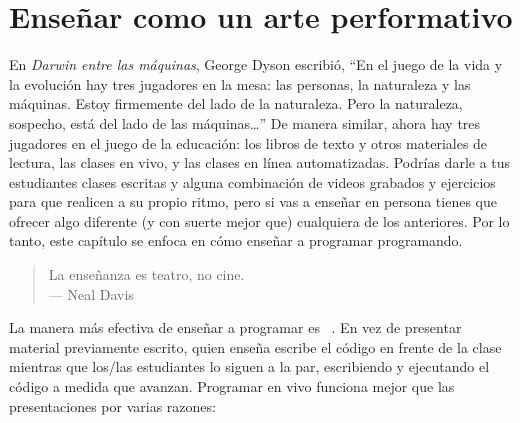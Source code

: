 \chapter{Enseñar como un arte performativo}\label{s:performance}

En \emph{Darwin entre las máquinas},
George Dyson escribió,
``En el juego de la vida y la evolución hay tres jugadores en la mesa:
las personas, la naturaleza y las máquinas.
Estoy firmemente del lado de la naturaleza.
Pero la naturaleza, sospecho, está del lado de las máquinas{\ldots}''
De manera similar, ahora hay tres jugadores en el juego de la educación:
los libros de texto y otros materiales de lectura,
las clases en vivo,
y las clases en línea automatizadas.
Podrías darle a tus estudiantes clases escritas y alguna combinación
de videos grabados y ejercicios para que realicen a su propio ritmo,
pero si vas a enseñar en persona tienes
que ofrecer algo diferente (y con suerte mejor que) cualquiera de los anteriores.
Por lo tanto, este capítulo se enfoca en cómo enseñar a programar programando.


\begin{quote}

  La enseñanza es teatro, no cine. \\
  --- Neal Davis

\end{quote}

La manera más efectiva de enseñar a programar es ~\cite{Rubi2013,Haar2017,Raj2018}.
En vez de presentar material previamente escrito,
quien enseña escribe el código en frente de la clase
mientras que los/las estudiantes lo siguen a la par,
escribiendo y ejecutando el código a medida que avanzan.
Programar en vivo funciona mejor que las presentaciones por varias razones:

